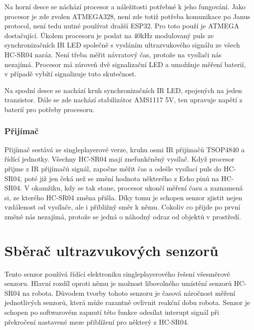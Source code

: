 Na horní desce se náchází procesor a náležitosti potřebné k jeho fungování.
Jako procesor je zde zvolen ATMEGA328, není zde totiž potřeba komunikace po Janus protocol, není tedu nutné používat dražší ESP32.
Pro toto použí je ATMEGA dostačující.
Úkolem procesoru je poslat na 40kHz modulovaný puls ze synchronizačních IR LED společně s vysláním ultrazvukového signálu ze všech HC-SR04 naráz. 
Není třeba měřit návratový čas, protože na vysílači nás nezajímá.
Procesor má zároveň dvě signalizační LED a umožňuje měření baterií, v případě vybítí signalizuje tuto skutečnost.

Na spodní desce se nachází kruh synchronizačních IR LED, spojených na jeden tranzistor.
Dále se zde nachází stabilizátor AMS1117 5V, ten upravuje napětí z baterií pro potřeby procesoru.

\subsubsection{Přijímač}
Přijímač sestává ze singleplayerové verze, kruhu osmi IR přijímačů TSOP4840 a řídící jednotky.
Všechny HC-SR04 mají znefunkčněný vysílač.
Když procesor přijme z IR přijímačů signál, započne měřit čas a odešle vysílací puls do HC-SR04, poté již jen čeká než se změní hodnota některého z Echo pinů na HC-SR04.
V okamžiku, kdy se tak stane, procesor ukončí měření času a zaznamená si, ze kterého HC-SR04 změna přišla.
Díky tomu je schopen senzor zjistit nejen vzdálenost od vysílače, ale i přibližný směr k němu.
Cokoliv co přijde po první změně nás nezajímá, protože se jedná o náhodný odraz od objektů v prostředí.

\section{Sběrač ultrazvukových senzorů}
Tento senzor používá řídící elektroniku singleplayerového řešení všesměrové senzoru.
Hlavní rozdíl oproti němu je možnost libovolného umístění senzorů HC-SR04 na robota.
Důvodem tvorby tohoto senzoru je časová náročnost měření jednotlivých senzorů, která může razantně ovlivnit reakční dobu robota.
Senzor je schopen po softwarovém zapnutí této funkce odesílat interupt signál při překročení nastavené meze přiblížení pro některý z HC-SR04.